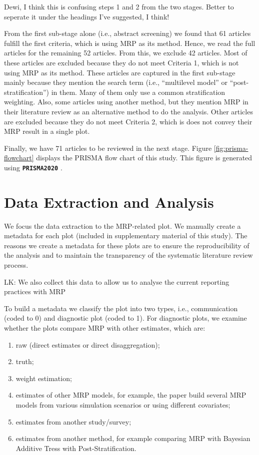 \documentclass{monashthesis}
\begin{document}
Dewi, I think this is confusing steps 1 and 2 from the two stages. Better to seperate it under the headings I've suggested, I think!

From the first sub-stage alone (i.e., abstract screening) we found that 61 articles fulfill the first criteria, which is using MRP as its method. Hence, we read the full articles for the remaining 52 articles. From this, we exclude 42 articles. Most of these articles are excluded because they do not meet Criteria 1, which is not using MRP as its method. These articles are captured in the first sub-stage mainly because they mention the search term (i.e., ``multilevel model'' or ``post-stratification'') in them. Many of them only use a common stratification weighting. Also, some articles using another method, but they mention MRP in their literature review as an alternative method to do the analysis. Other articles are excluded because they do not meet Criteria 2, which is does not convey their MRP result in a single plot.

Finally, we have 71 articles to be reviewed in the next stage. Figure \ref{fig:prisma-flowchart} displays the PRISMA flow chart of this study. This figure is generated using \textbf{\texttt{PRISMA2020}} \autocite{prisma2020}.

\hypertarget{data-extraction-and-analysis}{%
\section{Data Extraction and Analysis}\label{data-extraction-and-analysis}}

We focus the data extraction to the MRP-related plot. We manually create a metadata for each plot (included in supplementary material of this study). The reasons we create a metadata for these plots are to ensure the reproducibility of the analysis and to maintain the transparency of the systematic literature review process.

LK: We also collect this data to allow us to analyse the current reporting practices with MRP

To build a metadata we classify the plot into two types, i.e., communication (coded to 0) and diagnostic plot (coded to 1). For diagnostic plots, we examine whether the plots compare MRP with other estimates, which are:

\begin{enumerate}
\def\labelenumi{\arabic{enumi}.}
\tightlist
\item
  raw (direct estimates or direct disaggregation);
\item
  truth;
\item
  weight estimation;
\item
  estimates of other MRP models, for example, the paper build several MRP models from various simulation scenarios or using different covariates;
\item
  estimates from another study/survey;
\item
  estimates from another method, for example comparing MRP with Bayesian Additive Tress with Post-Stratification.
\end{enumerate}
\end{document}
